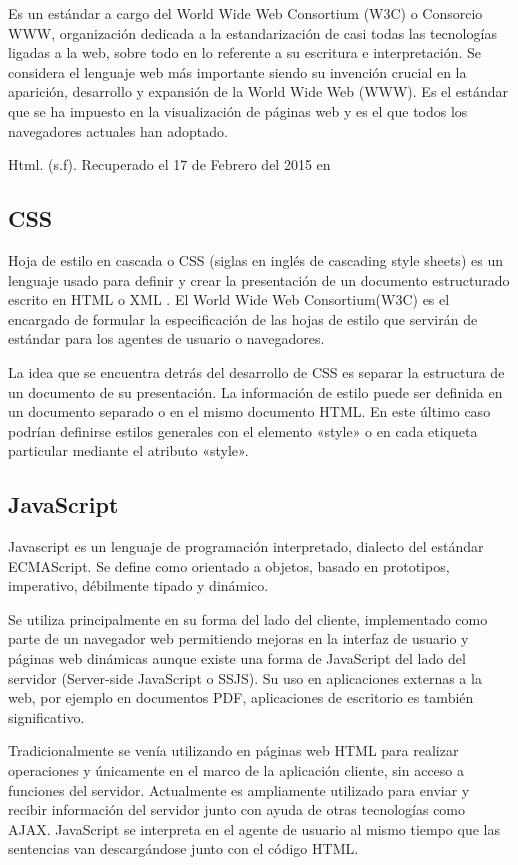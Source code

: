 Es un estándar a cargo del World Wide Web Consortium (W3C) o Consorcio WWW, organización dedicada a la estandarización de casi todas las tecnologías ligadas a la web, sobre todo en lo referente a su escritura e interpretación. Se considera el lenguaje web más importante siendo su invención crucial en la aparición, desarrollo y expansión de la World Wide Web (WWW). Es el estándar que se ha impuesto en la visualización de páginas web y es el que todos los navegadores actuales han adoptado.

Html. (s.f). Recuperado el 17 de Febrero del 2015 en

\subsection{CSS}

Hoja de estilo en cascada o CSS (siglas en inglés de cascading style sheets) es un lenguaje usado para definir y crear la presentación de un documento estructurado escrito en HTML o XML . El World Wide Web Consortium(W3C) es el encargado de formular la especificación de las hojas de estilo que servirán de estándar para los agentes de usuario o navegadores.

La idea que se encuentra detrás del desarrollo de CSS es separar la estructura de un documento de su presentación.
La información de estilo puede ser definida en un documento separado o en el mismo documento HTML. En este último caso podrían definirse estilos generales con el elemento «style» o en cada etiqueta particular mediante el atributo «style».

\subsection{JavaScript}

Javascript es un lenguaje de programación interpretado, dialecto del estándar ECMAScript. Se define como orientado a objetos, basado en prototipos, imperativo, débilmente tipado y dinámico.

Se utiliza principalmente en su forma del lado del cliente, implementado como parte de un navegador web permitiendo mejoras en la interfaz de usuario y páginas web dinámicas aunque existe una forma de JavaScript del lado del servidor (Server-side JavaScript o SSJS). Su uso en aplicaciones externas a la web, por ejemplo en documentos PDF, aplicaciones de escritorio es también significativo.

Tradicionalmente se venía utilizando en páginas web HTML para realizar operaciones y únicamente en el marco de la aplicación cliente, sin acceso a funciones del servidor. Actualmente es ampliamente utilizado para enviar y recibir información del servidor junto con ayuda de otras tecnologías como AJAX. JavaScript se interpreta en el agente de usuario al mismo tiempo que las sentencias van descargándose junto con el código HTML.

